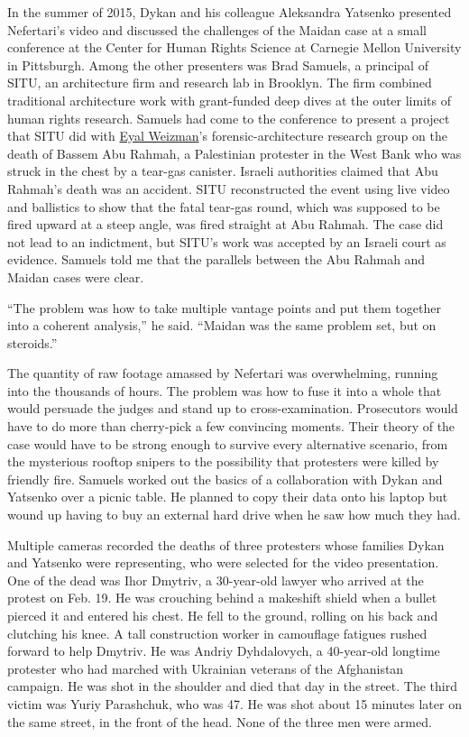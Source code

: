In the summer of 2015, Dykan and his colleague Aleksandra Yatsenko
presented Nefertari's video and discussed the challenges of the Maidan
case at a small conference at the Center for Human Rights Science at
Carnegie Mellon University in Pittsburgh. Among the other presenters was
Brad Samuels, a principal of SITU, an architecture firm and research lab
in Brooklyn. The firm combined traditional architecture work with
grant-funded deep dives at the outer limits of human rights research.
Samuels had come to the conference to present a project that SITU did
with
\href{https://www.nytimes3xbfgragh.onion/2018/04/06/arts/design/forensic-architecture-human-rights.html}{Eyal
Weizman}'s forensic-architecture research group on the death of Bassem
Abu Rahmah, a Palestinian protester in the West Bank who was struck in
the chest by a tear-gas canister. Israeli authorities claimed that Abu
Rahmah's death was an accident. SITU reconstructed the event using live
video and ballistics to show that the fatal tear-gas round, which was
supposed to be fired upward at a steep angle, was fired straight at Abu
Rahmah. The case did not lead to an indictment, but SITU's work was
accepted by an Israeli court as evidence. Samuels told me that the
parallels between the Abu Rahmah and Maidan cases were clear.

``The problem was how to take multiple vantage points and put them
together into a coherent analysis,'' he said. ``Maidan was the same
problem set, but on steroids.''

The quantity of raw footage amassed by Nefertari was overwhelming,
running into the thousands of hours. The problem was how to fuse it into
a whole that would persuade the judges and stand up to
cross-examination. Prosecutors would have to do more than cherry-pick a
few convincing moments. Their theory of the case would have to be strong
enough to survive every alternative scenario, from the mysterious
rooftop snipers to the possibility that protesters were killed by
friendly fire. Samuels worked out the basics of a collaboration with
Dykan and Yatsenko over a picnic table. He planned to copy their data
onto his laptop but wound up having to buy an external hard drive when
he saw how much they had.

Multiple cameras recorded the deaths of three protesters whose families
Dykan and Yatsenko were representing, who were selected for the video
presentation. One of the dead was Ihor Dmytriv, a 30-year-old lawyer who
arrived at the protest on Feb. 19. He was crouching behind a makeshift
shield when a bullet pierced it and entered his chest. He fell to the
ground, rolling on his back and clutching his knee. A tall construction
worker in camouflage fatigues rushed forward to help Dmytriv. He was
Andriy Dyhdalovych, a 40-year-old longtime protester who had marched
with Ukrainian veterans of the Afghanistan campaign. He was shot in the
shoulder and died that day in the street. The third victim was Yuriy
Parashchuk, who was 47. He was shot about 15 minutes later on the same
street, in the front of the head. None of the three men were armed.

